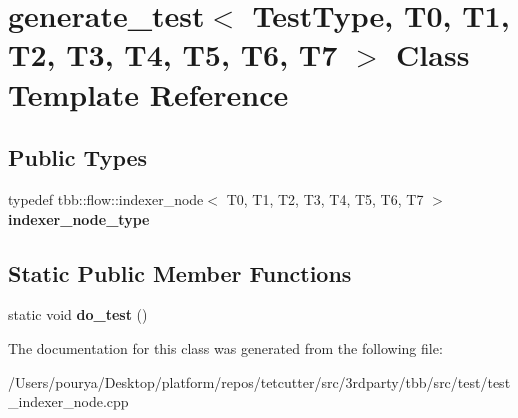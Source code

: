 \hypertarget{classgenerate__test_3_01TestType_00_01T0_00_01T1_00_01T2_00_01T3_00_01T4_00_01T5_00_01T6_00_01T7_01_4}{}\section{generate\+\_\+test$<$ Test\+Type, T0, T1, T2, T3, T4, T5, T6, T7 $>$ Class Template Reference}
\label{classgenerate__test_3_01TestType_00_01T0_00_01T1_00_01T2_00_01T3_00_01T4_00_01T5_00_01T6_00_01T7_01_4}
\subsection*{Public Types}
\begin{DoxyCompactItemize}
\item 
\hypertarget{classgenerate__test_3_01TestType_00_01T0_00_01T1_00_01T2_00_01T3_00_01T4_00_01T5_00_01T6_00_01T7_01_4_afd33b272130ef0fdb2203b6544668997}{}typedef tbb\+::flow\+::indexer\+\_\+node$<$ T0, T1, T2, T3, T4, T5, T6, T7 $>$ {\bfseries indexer\+\_\+node\+\_\+type}\label{classgenerate__test_3_01TestType_00_01T0_00_01T1_00_01T2_00_01T3_00_01T4_00_01T5_00_01T6_00_01T7_01_4_afd33b272130ef0fdb2203b6544668997}

\end{DoxyCompactItemize}
\subsection*{Static Public Member Functions}
\begin{DoxyCompactItemize}
\item 
\hypertarget{classgenerate__test_3_01TestType_00_01T0_00_01T1_00_01T2_00_01T3_00_01T4_00_01T5_00_01T6_00_01T7_01_4_aed6c43f15c92d358bb917871cef4248d}{}static void {\bfseries do\+\_\+test} ()\label{classgenerate__test_3_01TestType_00_01T0_00_01T1_00_01T2_00_01T3_00_01T4_00_01T5_00_01T6_00_01T7_01_4_aed6c43f15c92d358bb917871cef4248d}

\end{DoxyCompactItemize}


The documentation for this class was generated from the following file\+:\begin{DoxyCompactItemize}
\item 
/\+Users/pourya/\+Desktop/platform/repos/tetcutter/src/3rdparty/tbb/src/test/test\+\_\+indexer\+\_\+node.\+cpp\end{DoxyCompactItemize}

